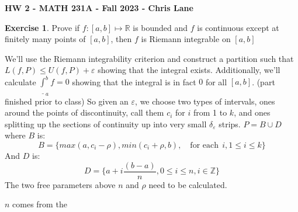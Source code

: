 \documentclass[11pt,oneside]{article}
\numberwithin{equation}{section}
\theoremstyle{definition}
\newtheorem{exercise}{Exercise}
\def\RR{\mathbb{R}}
\def\ZZ{\mathbb{Z}}
\begin{document}
\textbf{HW 2 - MATH 231A - Fall 2023 - Chris Lane}
\begin{exercise}
  Prove if $f:[a, b] \mapsto \RR $ is bounded and $f$ is continuous
  except at finitely many points of $[a,b]$, then $f$ is Riemann integrable on $[a,b ]$
\end{exercise}
\begin{solution}
  \begin{comment}
  The proof of integrability will be using the Riemann integrability
  criterion from class, where given an $\varepsilon$ one must find a
  partition such that the difference between $U(f, P)$ and $L(f, P)$
  is smaller than $\varepsilon$. $D$ is the number of points of
  discontinuity plus 1.

  Since on each section between the points of discontinuity, $f$ is
  continuous and bounded, $f$ is uniformly continuous, that is for
  $\frac{\varepsilon}{n}$ (where $n$ is the number of points of
  discontinuity plus one), and for each $I_i$ interval, one can find a
  $\delta _ i$ such that if we divide those intervals into $\delta_i$
  sized sub-intervals $I_{ik}$, then $ \sup \limits_{x \in I_{ik}}  M_{ik} - m_{ik} $
  will be less than $\varepsilon$, allowing us to show
  that $U(f, I_{ij}) \leq L(, I_{ij}) + \varepsilon / D$, for each
  integrable piece.  Adding them up, we get a partition $P$, of
  $\delta_{i}$ sized segments in each of the $D$ continuous segments,
  and
  $$
  L(f, p) = \sum _{l=1}^D L(f, I_i) \leq \sum _{l=1}^D ( U(f, I_i) + \varepsilon / D )
  $$
  So
  $$
  L(f, P) \leq U(f, P) \leq D * \varepsilon / D = U(f, P) + \varepsilon
  $$
  Showing by the Riemann Integrability criterion in class, that
  $\int _ a ^ b f$ exists and is finite.

  (Note: the above was what I had written before we reviewed the
  problem in class; I was planning to hand-wave away the points of
  discontinuity by replacing $f$ on $[x_{i-1}, x_i]$ with $f'_i$ that was
  continuous and arguing that the $L(f', P)$ and $U(f', P)$ were equal to
  $L(f,P)$ and $U(f, P)$ 
  with reference to the narrow strip argument from earlier in class;
  but I'm happy to do a more rigorous and explicit argument.)
  \end{comment}
  We'll use the Riemann integrability criterion and construct a
  partition such that $L(f, P) \leq U(f, P) + \varepsilon$ showing that
  the integral exists.  Additionally, we'll calculate $\underline \int
  _{a} ^ {b} f = 0$ showing that the integral is in fact $0$ for all
  $[a,b]$.  (part finished prior to class) So given an $\varepsilon$, we
  choose two types of intervals, ones around the points of
  discontinuity, call them $c_i$ for $i$ from 1 to $k$, and ones
  splitting up the sections of continuity up into very
  small $\delta_{\varepsilon}$ strips.  $P = B \cup D$ where $B$ is:
  $$
  B = \{ max(a, c_i - \rho), min(c_i + \rho, b), \quad \text{for each} \ \  i, 1 \leq i \leq k \}
  $$
  And $D$ is:
  $$
  D = \{ a + i \frac{(b - a)}{n}, 0 \leq i \leq n, i \in \ZZ \}
  $$
  The two free parameters above $n$ and $\rho$ need to be calculated.

  $n$ comes from the 
  
  
\end{solution}
\end{document}
